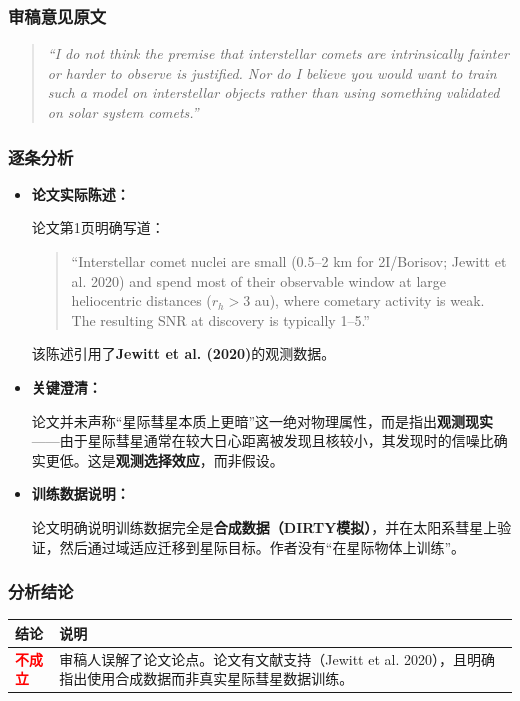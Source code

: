 \documentclass[12pt,a4paper]{article}
\begin{document}
\subsubsection{审稿意见原文}
\begin{quote}
\textit{``I do not think the premise that interstellar comets are intrinsically fainter or harder to observe is justified. Nor do I believe you would want to train such a model on interstellar objects rather than using something validated on solar system comets.''}
\end{quote}

\subsubsection{逐条分析}

\begin{itemize}[leftmargin=*]
    \item \textbf{论文实际陈述：}

    论文第1页明确写道：
    \begin{quote}
    ``Interstellar comet nuclei are small (0.5--2 km for 2I/Borisov; Jewitt et al. 2020) and spend most of their observable window at large heliocentric distances ($r_h > 3$ au), where cometary activity is weak. The resulting SNR at discovery is typically 1--5.''
    \end{quote}

    该陈述引用了\textbf{Jewitt et al. (2020)}的观测数据。

    \item \textbf{关键澄清：}

    论文并未声称``星际彗星本质上更暗''这一绝对物理属性，而是指出\textbf{观测现实}——由于星际彗星通常在较大日心距离被发现且核较小，其发现时的信噪比确实更低。这是\textbf{观测选择效应}，而非假设。

    \item \textbf{训练数据说明：}

    论文明确说明训练数据完全是\textbf{合成数据（DIRTY模拟）}，并在太阳系彗星上验证，然后通过域适应迁移到星际目标。作者没有``在星际物体上训练''。
\end{itemize}

\subsubsection{分析结论}
\begin{center}
\begin{tabular}{|p{3cm}|p{10cm}|}
\hline
\rowcolor{gray!20}
\textbf{结论} & \textbf{说明} \\
\hline
\textcolor{red}{\textbf{不成立}} & 审稿人误解了论文论点。论文有文献支持（Jewitt et al. 2020），且明确指出使用合成数据而非真实星际彗星数据训练。 \\
\hline
\end{tabular}
\end{center}
\end{document}
